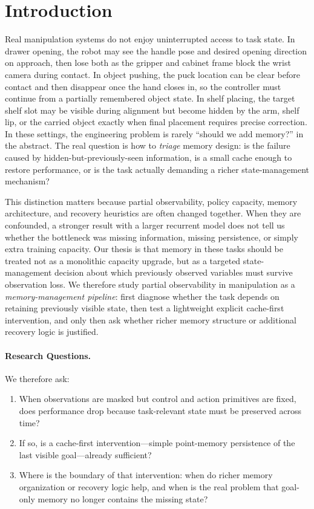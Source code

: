 \section{Introduction}
\label{sec:intro}

Real manipulation systems do not enjoy uninterrupted access to task state. In drawer opening, the robot may see the handle pose and desired opening direction on approach, then lose both as the gripper and cabinet frame block the wrist camera during contact. In object pushing, the puck location can be clear before contact and then disappear once the hand closes in, so the controller must continue from a partially remembered object state. In shelf placing, the target shelf slot may be visible during alignment but become hidden by the arm, shelf lip, or the carried object exactly when final placement requires precise correction. In these settings, the engineering problem is rarely ``should we add memory?'' in the abstract. The real question is how to \emph{triage} memory design: is the failure caused by hidden-but-previously-seen information, is a small cache enough to restore performance, or is the task actually demanding a richer state-management mechanism?

This distinction matters because partial observability, policy capacity, memory architecture, and recovery heuristics are often changed together. When they are confounded, a stronger result with a larger recurrent model does not tell us whether the bottleneck was missing information, missing persistence, or simply extra training capacity. Our thesis is that memory in these tasks should be treated not as a monolithic capacity upgrade, but as a targeted state-management decision about which previously observed variables must survive observation loss. We therefore study partial observability in manipulation as a \emph{memory-management pipeline}: first diagnose whether the task depends on retaining previously visible state, then test a lightweight explicit cache-first intervention, and only then ask whether richer memory structure or additional recovery logic is justified.

\paragraph{Research Questions.}
We therefore ask:
\begin{enumerate}
    \item[\textbf{Q1.}] When observations are masked but control and action primitives are fixed, does performance drop because task-relevant state must be preserved across time?
    \item[\textbf{Q2.}] If so, is a cache-first intervention---simple point-memory persistence of the last visible goal---already sufficient?
    \item[\textbf{Q3.}] Where is the boundary of that intervention: when do richer memory organization or recovery logic help, and when is the real problem that goal-only memory no longer contains the missing state?
\end{enumerate}

